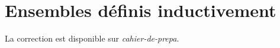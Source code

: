 \section{Ensembles définis inductivement}

La correction est disponible sur \textit{cahier-de-prepa}.

\begin{comment}
	\begin{exm}
		Avec $S = \N$, $\mathcal{B} = \{0, 2\} $, $A_1 = \{0\}$\/ et \begin{align*}
			f_1: A_1 \times \N &\longrightarrow \N \\
			(0, x) &\longmapsto x + 4.
		\end{align*}

		On a \[
			X \supseteq \{0, 2, 4, 6, 8, 10, \ldots, 20, \ldots\} = 2\N
		.\]
	\end{exm}
	\begin{exm}
		Avec $S$\/ l'ensemble des langages sur $\Sigma$, $\mathcal{B} = \{\O\} \cup \bigl\{\{a\}\:\big|\: a \in \Sigma \bigr\}$, et
		\begin{multicols}{3}
			\begin{align*}
				f_1: S \times S &\longrightarrow S \\
				(L_1, L_2) &\longmapsto L_1 \cup L_2,
			\end{align*}
			\begin{align*}
				f_2: S \times S &\longrightarrow S \\
				(L_1, L_2) &\longmapsto L_1 \cdot L_2,
			\end{align*}
			\begin{align*}
				f_3: S &\longrightarrow S \\
				L &\longmapsto L^*.
			\end{align*}
		\end{multicols}
	\end{exm}

\begin{enumerate}
	\item Soit $\mathcal{A} = \{X \subseteq S  \mid X \supseteq \mathcal{B} \mathrel{\text{et}} X \text{ est stable par } f_i\}$. On a $S \in \mathcal{A}$\/ et donc $\mathcal{A} \neq \O$. De plus, soit \[
			Y = \{x \in S  \mid \forall X \in \mathcal{A},\,x \in X\} = \bigcap_{X \in \mathcal{A}} X
		.\]
		Soit $b \in \mathcal{B}$, on a $\forall X \in A,\, b \in X$. D'où $b \in Y$\/ par intersection. On en déduit que $\mathcal{B} \subseteq Y$.


\end{comment}
